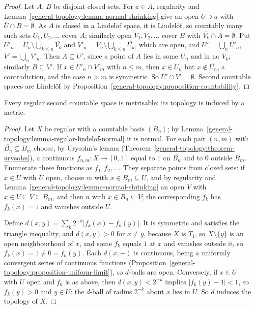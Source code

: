 \begin{proof}
Let $A$, $B$ be disjoint closed sets. For $a \in A$, regularity and Lemma~\ref{general-topology:lemma-normal-shrinking} give an open $U \ni a$ with $\overline U \cap B = \emptyset$. As $A$ is closed in a Lindel\"of space, it is
Lindel\"of, so countably many such sets $U_1, U_2, \ldots$ cover $A$; similarly open $V_1, V_2, \ldots$ cover $B$ with $\overline{V_k} \cap A = \emptyset$. Put $U'_n = U_n \setminus \bigcup_{k \leq n}\overline{V_k}$ and
$V'_n = V_n \setminus \bigcup_{k \leq n}\overline{U_k}$, which are open, and $U' = \bigcup_nU'_n$, $V' = \bigcup_nV'_n$. Then $A \subseteq U'$, since a point of $A$ lies in some $U_n$ and in no $\overline{V_k}$; similarly $B \subseteq V'$. If
$x \in U'_n \cap V'_m$ with $n \leq m$, then $x \in U_n$ but $x \notin \overline{U_n}$, a contradiction, and the case $n > m$ is symmetric. So $U' \cap V' = \emptyset$. Second countable spaces are Lindel\"of by
Proposition~\ref{general-topology:proposition-countability}.
\end{proof}

\begin{theorem}\label{general-topology:theorem-urysohn-metrisation}
Every regular second countable space is metrisable: its topology is induced by a metric.
\end{theorem}

\begin{proof}
Let $X$ be regular with a countable basis $(B_n)$; by Lemma~\ref{general-topology:lemma-regular-lindelof-normal} it is normal. For each pair $(n, m)$ with $\overline{B_n} \subseteq B_m$ choose, by Urysohn's lemma
(Theorem~\ref{general-topology:theorem-urysohn}), a continuous $f_{n,m} \colon X \to [0, 1]$ equal to $1$ on $\overline{B_n}$ and to $0$ outside $B_m$. Enumerate these functions as $f_1, f_2, \ldots$. They separate points from closed
sets: if $x \in U$ with $U$ open, choose $m$ with $x \in B_m \subseteq U$, and by regularity and Lemma~\ref{general-topology:lemma-normal-shrinking} an open $V$ with $x \in V \subseteq \overline V \subseteq B_m$, and then $n$ with
$x \in B_n \subseteq V$; the corresponding $f_k$ has $f_k(x) = 1$ and vanishes outside $U$.

Define $d(x, y) = \sum_k2^{-k}|f_k(x) - f_k(y)|$. It is symmetric and satisfies the triangle inequality, and $d(x, y) > 0$ for $x \neq y$, because $X$ is $T_1$, so $X \setminus \{y\}$ is an open neighbourhood of $x$, and some $f_k$ equals $1$ at $x$ and vanishes
outside it, so $f_k(x) = 1 \neq 0 = f_k(y)$. Each $d(x, -)$ is continuous, being a uniformly convergent series of continuous functions (Proposition~\ref{general-topology:proposition-uniform-limit}), so $d$-balls are open.
Conversely, if $x \in U$ with $U$ open and $f_k$ is as above, then $d(x, y) < 2^{-k}$ implies $|f_k(y) - 1| < 1$, so $f_k(y) > 0$ and $y \in U$: the $d$-ball of radius $2^{-k}$ about $x$ lies in $U$. So $d$ induces the topology of $X$.
\end{proof}


